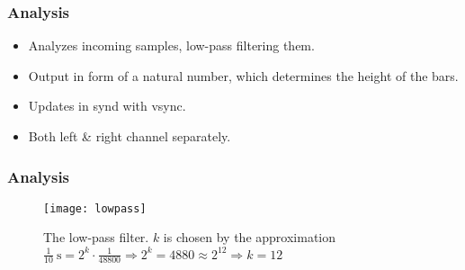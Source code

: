 \begin{frame}
  \frametitle{Analysis}
	\begin{itemize}
		\item Analyzes incoming samples, low-pass filtering them.
		\item Output in form of a natural number, which determines the height of the bars.
		\item Updates in synd with vsync.
		\item Both left & right channel separately.
	\end{itemize}
\end{frame}

\begin{frame}
  \frametitle{Analysis}
	\begin{figure}[h]
		\centering
			\texttt{[image: lowpass]}
			\caption{The low-pass filter. $k$ is chosen by the approximation $\frac{1}{10}\mathrm{\ s} = 2^k\cdot\frac{1}{48800}\Rightarrow 2^k=4880\approx 2^{12}\Rightarrow k = 12 $}
			\label{fig:lowpass}
\end{figure}
\end{frame}
